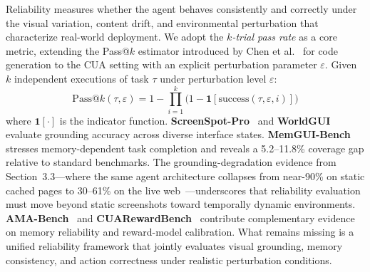 Reliability measures whether the agent behaves consistently and correctly under the visual variation, content drift, and environmental perturbation that characterize real-world deployment. We adopt the \emph{$k$-trial pass rate} as a core metric, extending the Pass@$k$ estimator introduced by Chen et al.~\cite{chen2021evaluating} for code generation to the CUA setting with an explicit perturbation parameter $\varepsilon$. Given $k$ independent executions of task $\tau$ under perturbation level $\varepsilon$:
\begin{equation}
\mathrm{Pass}@k(\tau, \varepsilon) = 1 - \prod_{i=1}^{k}\bigl(1 - \mathbf{1}[\mathrm{success}(\tau, \varepsilon, i)]\bigr)
\label{eq:passkeps}
\end{equation}
where $\mathbf{1}[\cdot]$ is the indicator function. \textbf{ScreenSpot-Pro}~\cite{screenspotpro2025} and \textbf{WorldGUI}~\cite{worldgui2025} evaluate grounding accuracy across diverse interface states. \textbf{MemGUI-Bench}~\cite{memguibench2026} stresses memory-dependent task completion and reveals a 5.2--11.8\% coverage gap relative to standard benchmarks. The grounding-degradation evidence from Section~3.3---where the same agent architecture collapses from near-90\% on static cached pages to 30--61\% on the live web~\cite{onlinemind2web2025}---underscores that reliability evaluation must move beyond static screenshots toward temporally dynamic environments. \textbf{AMA-Bench}~\cite{amabench2025} and \textbf{CUARewardBench}~\cite{cuarewardbench2025} contribute complementary evidence on memory reliability and reward-model calibration. What remains missing is a unified reliability framework that jointly evaluates visual grounding, memory consistency, and action correctness under realistic perturbation conditions.


